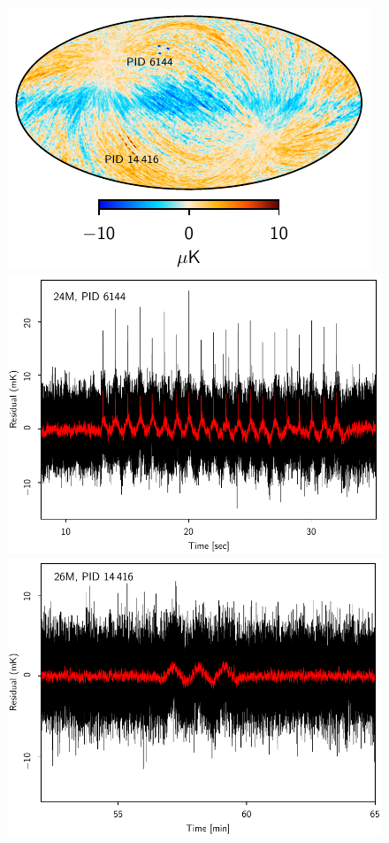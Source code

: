 \documentclass[twocolumn]{aa}
\begin{document}
\begin{figure}[t]
  \center
  \includegraphics[width=\linewidth]{figs/ncorr_features_T.pdf}
  \includegraphics[width=\linewidth]{figs/feature_tod1.pdf}
  \includegraphics[width=\linewidth]{figs/feature_tod2.pdf}

\end{figure}
\end{document}
